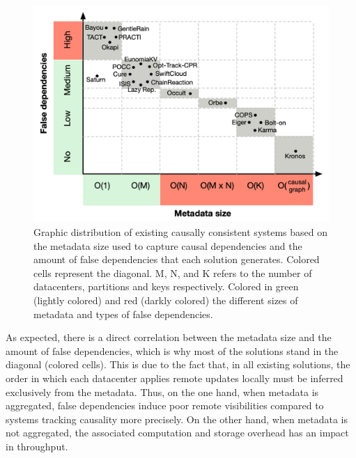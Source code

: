 \begin{figure}[tp]
    \centering
    \includegraphics[scale=0.3]{figures/soa-metadata-graph.png}
    \caption{Graphic distribution of existing causally consistent systems based on the metadata size used to capture causal dependencies and the amount of false dependencies that each solution generates. Colored cells represent the diagonal. M, N, and K refers to the number of datacenters, partitions and keys respectively. Colored in green (lightly colored) and red (darkly colored) the different sizes of metadata and types of false dependencies.}
    \label{fig:soa-metadata-graph}
\end{figure}

As expected, 
there is a direct correlation between the metadata size and the amount of false 
dependencies, 
which is why most of the solutions stand in the diagonal (colored cells). 
This is due to the fact that, 
in all existing solutions, 
the order in which each datacenter applies remote updates locally must be inferred
exclusively from the metadata. 
Thus, on the one hand, when metadata is aggregated, 
false dependencies induce poor remote visibilities compared to systems tracking 
causality more precisely. 
On the other hand, when metadata is not aggregated, 
the associated computation and storage overhead has an impact in throughput.